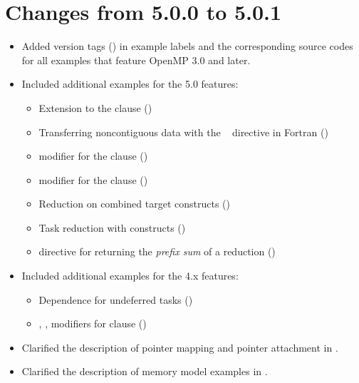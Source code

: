\section{Changes from 5.0.0 to 5.0.1}
\label{sec:history_50_to_501}

\begin{itemize}
\item Added version tags () in example labels 
and the corresponding source codes for all examples that feature
OpenMP 3.0 and later. 

\item Included additional examples for the 5.0 features:

\begin{itemize}
\item Extension to the  clause
()
\item Transferring noncontiguous data with the ~ directive in Fortran ()
\item {} modifier for the  clause                             ()
\item {} modifier for the  clause                                      ()
\item Reduction on combined target constructs                                                     ()
\item Task reduction with  constructs 
   ()
\item {} directive for returning the \emph{prefix sum} of a reduction                  ()

\end{itemize}

\item Included additional examples for the 4.x features:

\begin{itemize}
\item Dependence for undeferred tasks
()
\item {}, ,  modifiers for  clause ()

\end{itemize}

\item Clarified the description of pointer mapping and pointer attachment in 
.
\item Clarified the description of memory model examples
in .

\end{itemize}


